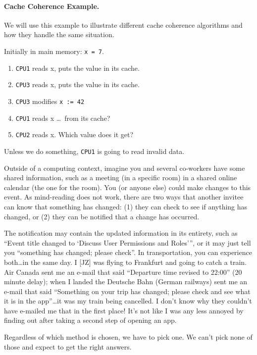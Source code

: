 \documentclass[a4paper]{report}
\begin{document}
\paragraph{Cache Coherence Example.} We will use this example to illustrate
different cache coherence algorithms and how they handle the same situation.

Initially in main memory: {\tt x = 7}.

  \begin{enumerate}
    \item {\tt CPU1} reads x, puts the value in its cache.
    \item {\tt CPU3} reads x, puts the value in its cache.
    \item {\tt CPU3} modifies {\tt x := 42}
    \item {\tt CPU1} reads x \ldots ~from its cache?
    \item {\tt CPU2} reads x. Which value does it get?
  \end{enumerate}

Unless we do something, {\tt CPU1} is going to read invalid data.
  
Outside of a computing context, imagine you and several co-workers have some shared information, such as a meeting (in a specific room) in a shared online calendar (the one for the room). You (or anyone else) could make changes to this event. As mind-reading does not work, there are two ways that another invitee can know that something has changed: (1) they can check to see if anything has changed, or (2) they can be notified that a change has occurred. 

The notification may contain the updated information in its entirety, such as ``Event title changed to `Discuss User Permissions and Roles''', or it may just tell you ``something has changed; please check''. In transportation, you can experience both\ldots in the same day. I [JZ] was flying to Frankfurt and going to catch a train. Air Canada sent me an e-mail that said ``Departure time revised to 22:00'' (20 minute delay); when I landed the Deutsche Bahn (German railways) sent me an e-mail that said ``Something on your trip has changed; please check and see what it is in the app''\ldots it was my train being cancelled. I don't know why they couldn't have e-mailed me that in the first place! It's not like I was any less annoyed by finding out after taking a second step of opening an app.

Regardless of which method is chosen, we have to pick one. We can't pick none of those and expect to get the right answers.
\end{document}
